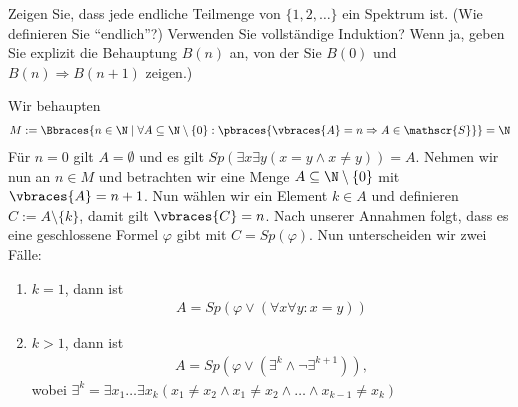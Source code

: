 
\begin{exercise}[71]

\phantom{}
	Zeigen Sie, dass jede endliche Teilmenge von  $\{1,2, \dots \}$ ein Spektrum ist. (Wie definieren Sie \enquote{endlich}?) Verwenden Sie vollständige Induktion? Wenn ja, geben Sie explizit die Behauptung $B(n)$ an, von der Sie $B(0)$ und $B(n) \Rightarrow B(n + 1)$ zeigen.)

\end{exercise}


\begin{solution}

\phantom{}
	Wir behaupten
	\begin{align*}
	M := \Bbraces{n \in \N \mid \forall A \subseteq \N \setminus \{0\}: \pbraces{\vbraces{A} = n \Rightarrow  A \in \mathscr{S}}} = \N
	\end{align*}
	Für $n = 0$ gilt $A = \emptyset$ und es gilt $Sp(\exists x \exists y(x = y \land x \neq y)) = A$. \newline
	Nehmen wir nun an $n \in M$ und betrachten wir eine Menge $A \subseteq \N \setminus \{0\}$ mit $\vbraces{A} = n + 1$. Nun wählen wir ein Element $k \in A$ und definieren $C := A \setminus \{k\}$, damit gilt $\vbraces{C} = n$. Nach unserer Annahmen folgt, dass es eine geschlossene Formel $\varphi$ gibt mit $C = Sp(\varphi)$. Nun unterscheiden wir zwei Fälle:
	\begin{enumerate}[label = Fall \arabic*:]
		\item $k = 1$, dann ist
			\begin{align*}
			A = Sp(\varphi \lor (\forall x \forall y: x = y))
			\end{align*}
		\item $k > 1$, dann ist
			\begin{align*}
			A = Sp(\varphi \lor (\exists^k \land \neg \exists^{k + 1})),
			\end{align*}
			wobei $\exists^k = \exists x_1 \dots \exists x_k (x_1 \neq x_2 \land x_1 \neq x_2 \land \dots \land x_{k - 1} \neq x_k)$
	\end{enumerate}
\end{solution}
